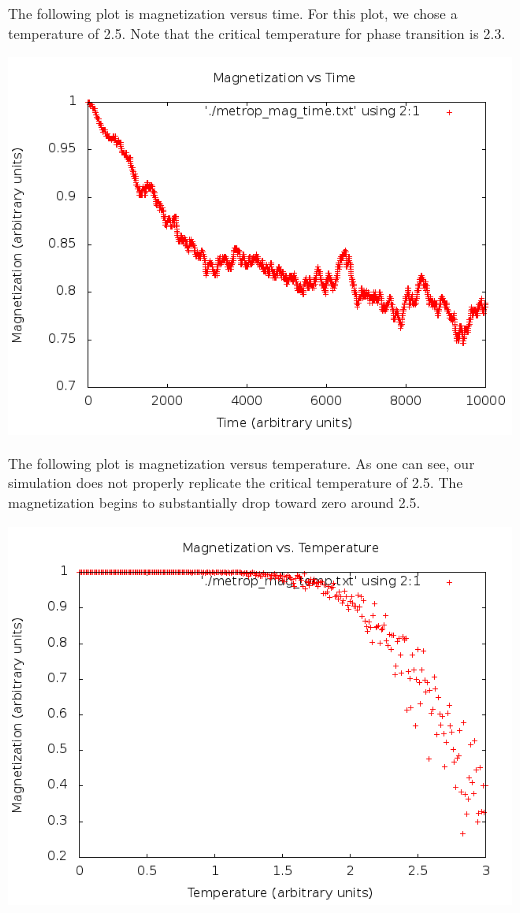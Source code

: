 \documentclass[11pt,letterpaper,fleqn]{article}
\begin{document}
The following plot is magnetization versus time.  For this plot, we chose a temperature of 2.5.  
Note that the critical temperature for phase transition is 2.3.

\includegraphics[width=1\textwidth]{images/metrop_mag_time.png}


The following plot is magnetization versus temperature. As one can see, our simulation does not properly replicate
the critical temperature of 2.5.  The magnetization begins to substantially drop toward zero around 2.5.

\includegraphics[width=1\textwidth]{images/metrop_mag_temp.png}



\end{document}
